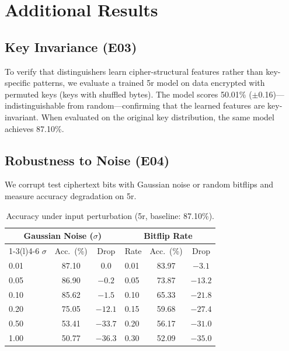 \section{Additional Results}
\label{sec:app-additional}

\FloatBarrier
\subsection{Key Invariance (E03)}

To verify that distinguishers learn cipher-structural features rather than key-specific patterns, we evaluate a trained \speck 5r model on data encrypted with permuted keys (keys with shuffled bytes).
The model scores 50.01\% ($\pm$0.16)---indistinguishable from random---confirming that the learned features are key-invariant.
When evaluated on the original key distribution, the same model achieves 87.10\%.

\FloatBarrier
\subsection{Robustness to Noise (E04)}

We corrupt test ciphertext bits with Gaussian noise or random bitflips and measure accuracy degradation on \speck 5r.

\begin{table}[htbp]
\centering
\caption{Accuracy under input perturbation (\speck 5r, baseline: 87.10\%).}
\label{tab:robustness}
\begin{tabular}{@{}lcclcc@{}}
\toprule
\multicolumn{3}{c}{\textbf{Gaussian Noise ($\sigma$)}} & \multicolumn{3}{c}{\textbf{Bitflip Rate}} \\
\cmidrule(r){1-3}\cmidrule(l){4-6}
$\sigma$ & Acc.\ (\%) & Drop & Rate & Acc.\ (\%) & Drop \\
\midrule
0.01 & 87.10 & 0.0  & 0.01 & 83.97 & $-3.1$ \\
0.05 & 86.90 & $-0.2$ & 0.05 & 73.87 & $-13.2$ \\
0.10 & 85.62 & $-1.5$ & 0.10 & 65.33 & $-21.8$ \\
0.20 & 75.05 & $-12.1$ & 0.15 & 59.68 & $-27.4$ \\
0.50 & 53.41 & $-33.7$ & 0.20 & 56.17 & $-31.0$ \\
1.00 & 50.77 & $-36.3$ & 0.30 & 52.09 & $-35.0$ \\
\bottomrule
\end{tabular}
\end{table}

